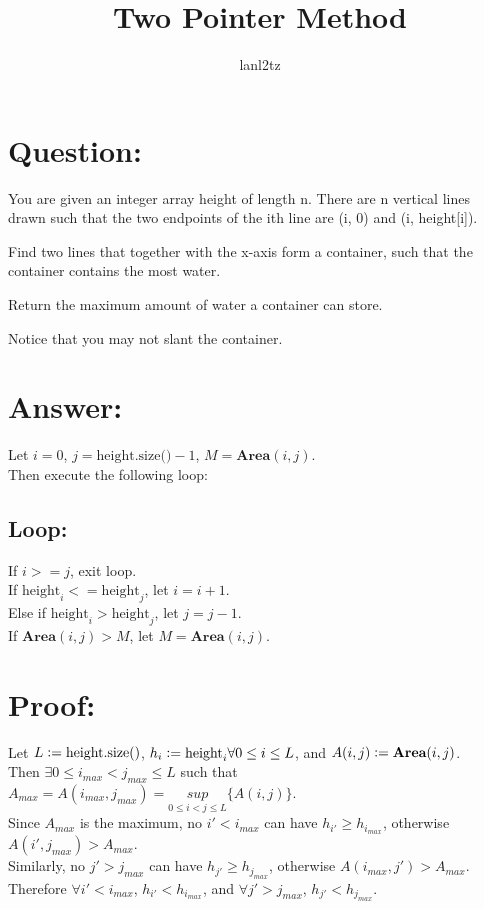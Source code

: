 \documentclass{article}
\title{Two Pointer Method}
\author{lanl2tz}
\newcommand{\defeq}{\vcentcolon=}
\begin{document}
\maketitle
\section*{Question:}
You are given an integer array height of length n. There are n vertical lines drawn such that the two endpoints of the ith line are (i, 0) and (i, height[i]).

Find two lines that together with the x-axis form a container, such that the container contains the most water.

Return the maximum amount of water a container can store.

Notice that you may not slant the container.

\section*{Answer:}
Let $i = 0$, $j = \text{height.size()} - 1$, $M = \textbf{Area}(i, j)$.\\
Then execute the following loop:
\subsection*{Loop:}
If $i >= j$, exit loop.\\
If $\text{height}_{i} <= \text{height}_{j}$, let $i = i + 1$.\\
Else if $\text{height}_{i} > \text{height}_{j}$, let $j = j - 1$.\\
If $\textbf{Area}(i, j) > M$, let $M = \textbf{Area}(i, j)$.
\section*{Proof:}
Let $L \defeq \text{height.size}()$, $h_i \defeq \text{height}_{i} \forall 0\leq i\leq L$, and $A(i, j) \defeq \textbf{Area}(i, j)$.\\
Then $\exists 0\leq i_{max} < j_{max} \leq L$ such that $A_{max} = A(i_{max}, j_{max}) = \underset{ 0\leq i < j \leq L}{sup}\{A(i,j)\}$.\\
Since $A_{max}$ is the maximum, no $i' < i_{max}$ can have $h_{i'} \geq h_{i_{max}}$, otherwise $A(i', j_{max}) > A_{max}$.\\
Similarly, no $j' > j_{max}$ can have $h_{j'} \geq h_{j_{max}}$, otherwise $A(i_{max}, j') > A_{max}$.\\
Therefore $\forall i' < i_{max}$, $h_{i'} < h_{i_{max}}$, and $\forall j' > j_{max}$, $h_{j'} < h_{j_{max}}$.\\
\end{document}
